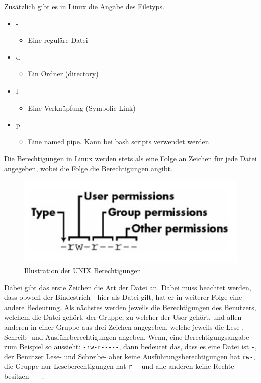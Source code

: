 \documentclass{article}
\begin{document}
	Zusätzlich gibt es in Linux die Angabe des Filetyps.
	\begin{itemize}
		\item{-}
		\begin{itemize}
			\item{Eine reguläre Datei}
		\end{itemize}
		\item{d}
		\begin{itemize}
			\item{Ein Ordner (directory)}
		\end{itemize}
		\item{l}
		\begin{itemize}
			\item{Eine Verknüpfung (Symbolic Link)}
		\end{itemize}
		\item{p}
		\begin{itemize}
			\item{Eine named pipe. Kann bei bash scripts verwendet werden.}
		\end{itemize}
	\end{itemize}
	Die Berechtigungen in Linux werden stets als eine Folge an Zeichen für jede Datei angegeben, wobei die Folge die Berechtigungen angibt. \\
	\begin{figure}[H]
	\centering
	\includegraphics[scale=0.5]{Bilder/permissions.png}
	\caption{Illustration der UNIX Berechtigungen}
	\end{figure}
	Dabei gibt das erste Zeichen die Art der Datei an. Dabei muss beachtet werden, dass obwohl der Bindestrich - hier als Datei gilt, hat er in weiterer Folge eine andere Bedeutung. Als nächstes werden jeweils die Berechtigungen des Benutzers, welchem die Datei gehört, der Gruppe, zu welcher der User gehört, und allen anderen in einer Gruppe aus drei Zeichen angegeben, welche jeweils die Lese-, Schreib- und Ausführberechtigungen angeben. Wenn, eine Berechtigungsangabe zum Beispiel so aussieht: \verb|-rw-r-----|, dann bedeutet das, dass es eine Datei ist \verb|-|, der Benutzer Lese- und Schreibe- aber keine Ausführungsberechtigungen hat \verb|rw-|, die Gruppe nur Leseberechtigungen hat \verb|r--| und alle anderen keine Rechte besitzen \verb|---|. 
\end{document}
